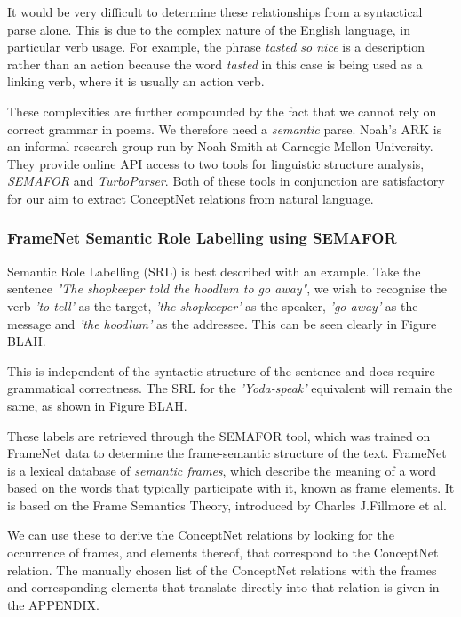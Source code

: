 It would be very difficult to determine these relationships from a syntactical parse alone. This is due to the complex nature of the English language, in particular verb usage. For example, the phrase \textit{tasted so nice} is a description rather than an action because the word \textit{tasted} in this case is being used as a linking verb, where it is usually an action verb.

These complexities are further compounded by the fact that we cannot rely on correct grammar in poems. We therefore need a \textit{semantic} parse. Noah's ARK is an informal research group run by Noah Smith at Carnegie Mellon University. They provide online API access to two tools for linguistic structure analysis, \textit{SEMAFOR} and \textit{TurboParser}. Both of these tools in conjunction are satisfactory for our aim to extract ConceptNet relations from natural language.

\subsubsection{FrameNet Semantic Role Labelling using SEMAFOR}
\label{sec:sema}

Semantic Role Labelling (SRL) is best described with an example. Take the sentence \textit{"The shopkeeper told the hoodlum to go away"}, we wish to recognise the verb \textit{'to tell'} as the target, \textit{'the shopkeeper'} as the speaker, \textit{'go away'} as the message and \textit{'the hoodlum'} as the addressee. This can be seen clearly in Figure BLAH. 

This is independent of the syntactic structure of the sentence and does require grammatical correctness. The SRL for the \textit{'Yoda-speak'} equivalent will remain the same, as shown in Figure BLAH.

These labels are retrieved through the SEMAFOR tool, which was trained on FrameNet data to determine the frame-semantic structure of the text. FrameNet is a lexical database of \textit{semantic frames}, which describe the meaning of a word based on the words that typically participate with it, known as frame elements. It is based on the Frame Semantics Theory, introduced by Charles J.Fillmore et al.

We can use these to derive the ConceptNet relations by looking for the occurrence of frames, and elements thereof, that correspond to the ConceptNet relation. The manually chosen list of the ConceptNet relations with the frames and corresponding elements that translate directly into that relation is given in the APPENDIX.

